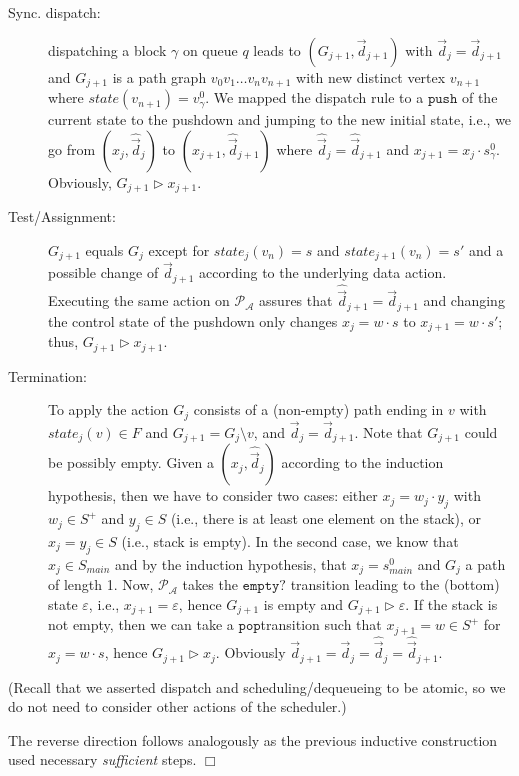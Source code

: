 \documentclass[runningheads,oribibl,]{article}
\newcommand{\Aa}{\ensuremath{\mathcal{A}}\xspace}
\newcommand{\Pp}{\ensuremath{\mathcal{P}}\xspace}
\newcommand{\e}{\ensuremath{\varepsilon}\xspace}
\newcommand{\cfont}[1]{\ensuremath{\mathtt{#1}}\xspace}
\newcommand{\main}{\ensuremath{\textit{main}}\xspace}
\newcommand{\Graph}{\ensuremath{G}}
\newcommand{\Data}{\ensuremath{\vec{d}}}
\newcommand{\DData}{\ensuremath{\widehat{\vec{d}}}}
\newcommand{\state}{\ensuremath{\textit{state}}}
\newcommand{\push}{\ensuremath{\cfont{push}}}
\newcommand{\pop}{\ensuremath{\cfont{pop}}}
\newcommand{\emptystack}{\ensuremath{\cfont{empty?}}}
\newenvironment{proof}{\noindent{\it Proof.\hspace*{.5cm}}}{}
\newcommand{\qed}{\hfill$\Box$}
\begin{document}
\begin{proof}
\begin{description}
\item[Sync. dispatch:] dispatching a block $\gamma$ on queue $q$
  leads to $(\Graph_{j+1},\Data_{j+1})$ with $\Data_{j}=\Data_{j+1}$
  and $\Graph_{j+1}$ is a path graph $v_0 v_1\dots v_n v_{n+1}$ with new
  distinct vertex $v_{n+1}$ where $\state(v_{n+1})=v^0_\gamma$.
  We mapped the dispatch rule to a $\push$ of the current state to the pushdown
  and jumping to the new initial state, i.e., we go from $(x_j,\DData_j)$ to
  $(x_{j+1},\DData_{j+1})$ where $\DData_j=\DData_{j+1}$ and
  $x_{j+1}=x_j\cdot s^0_\gamma$. Obviously, $\Graph_{j+1}\triangleright x_{j+1}$.
\item[Test/Assignment:]
  $\Graph_{j+1}$ equals $\Graph_{j}$ except for $\state_j(v_n)=s$ and
  $\state_{j+1}(v_n)=s'$ and a possible change of $\Data_{j+1}$ according
  to the underlying data action. Executing the same action on $\Pp_\Aa$
  assures that $\DData_{j+1}=\Data_{j+1}$ and changing the control state of
  the pushdown only changes $x_j=w\cdot s$ to $x_{j+1}=w\cdot s'$; thus,
  $\Graph_{j+1}\triangleright x_{j+1}$.
\item[Termination:]
      To apply the action $\Graph_j$ consists of a (non-empty) path ending in
      $v$ with $\state_j(v)\in F$ and $\Graph_{j+1}=\Graph_{j}\setminus v$,
      and $\Data_j=\Data_{j+1}$. Note that $\Graph_{j+1}$ could be possibly
      empty.
      Given a $(x_j,\DData_j)$ according to the induction hypothesis, then
      we have to consider two cases: either $x_j=w_j\cdot y_j$ with $w_j\in S^+$
      and $y_j\in S$ (i.e., there is at least one element on the stack), or
      $x_j=y_j\in S$ (i.e., stack is empty). In the second case, we know that
      $x_j\in S_\main$ and by the induction hypothesis, that $x_j=s^0_\main$
      and $\Graph_j$ a path of length 1.
      Now, $\Pp_\Aa$ takes the $\emptystack$ transition leading to the (bottom)
      state $\e$, i.e., $x_{j+1}=\e$, hence $\Graph_{j+1}$ is empty and
      $\Graph_{j+1}\triangleright \e$.
      If the stack is not empty, then we can take a \pop transition
      such that $x_{j+1}=w\in S^+$ for $x_j=w\cdot s$, hence
      $\Graph_{j+1}\triangleright
      x_j$. Obviously $\Data_{j+1}=\Data_j=\DData_j=\DData_{j+1}$.
 \end{description}
  (Recall that we asserted dispatch and scheduling/dequeueing to be atomic, so we
  do not need to consider other actions of the scheduler.)

  The reverse direction follows analogously as the previous inductive
  construction used necessary \emph{sufficient} steps.
  \qed
\end{proof}
\end{document}

